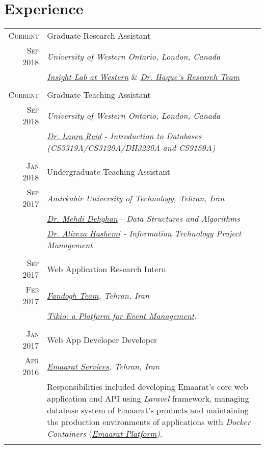 \documentclass[a4paper,10pt]{article}
\begin{document}
\section{Experience}
\begin{longtable}{r|p{14.70cm}}
    \textsc{Current} & Graduate Research Assistant \\
    \textsc{Sep 2018} & \emph{University of Western Ontario, London, Canada}\\
    & \emph{\href{http://insight.uwo.ca/}{Insight Lab at Western}} \& \emph{\href{http://www.csd.uwo.ca/faculty/ahaque32/research_team.html}{Dr. Haque's Research Team}} \\\multicolumn{2}{c}{} \\
    
    \textsc{Current} & Graduate Teaching Assistant \\
    \textsc{Sep 2018} & \emph{University of Western Ontario, London, Canada}\\
    & \emph{\href{http://www.csd.uwo.ca/people/faculty/full_time_faculty.html}{Dr. Laura Reid} - Introduction to Databases (CS3319A/CS3120A/DH3220A and CS9159A)}\\\multicolumn{2}{c}{} \\

    \textsc{Jan 2018} & Undergraduate Teaching Assistant \\
    \textsc{Sep 2017} & \emph{Amirkabir University of Technology, Tehran, Iran}\\
    & \emph{\href{http://ceit.aut.ac.ir/~dehghan/}{Dr. Mehdi Dehghan} - Data Structures and Algorithms}\\ & \emph{\href{http://www.aut.ac.ir/sa.hashemi}{Dr. Alireza Hashemi} - Information Technology Project Management}\\\multicolumn{2}{c}{} \\

    \textsc{Sep 2017} & Web Application Research Intern \\
    \textsc{Feb 2017} & \emph{\href{https://fandogh.org}{Fandogh Team}, Tehran, Iran}\\
    & \textit{\href{https://tikio.io}{Tikio: a Platform for Event Management}.} \\\multicolumn{2}{c}{} \\
    
    \textsc{Jan 2017} & Web App Developer Developer\\
    \textsc{Apr 2016} & \emph{\href{https://emaarat.com}{Emaarat Services}, Tehran, Iran}\\
    & \footnotesize{Responsibilities included developing Emaarat’s core web application and API using \textit{Laravel} framework, managing database system of Emaarat's products and maintaining the production environments of applications with \textit{Docker Containers} (\textit{\href{https://emaarat.com}{Emaarat Platform})}.}\\\multicolumn{2}{c}{} \\
    

\end{longtable}
\end{document}

